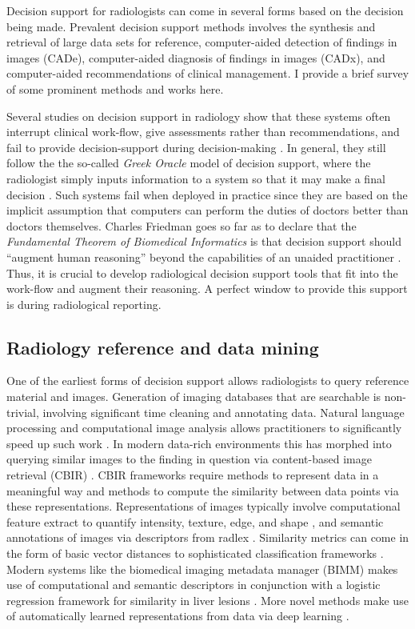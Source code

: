 Decision support for radiologists can come in several forms based on the decision being made. Prevalent decision support methods involves the synthesis and retrieval of large data sets for reference, computer-aided detection of findings in images (CADe), computer-aided diagnosis of findings in images (CADx), and computer-aided recommendations of clinical management. I provide a brief survey of some prominent methods and works here.


Several studies on decision support in radiology show that these systems often interrupt clinical  work-flow, give assessments rather than recommendations, and fail to provide decision-support during decision-making \cite{Kawamoto:2005gn,Morgan:2011ct}. In general, they still follow the the so-called \emph{Greek Oracle} model of decision support, where the radiologist simply inputs information to a system so that it may make a final decision \cite{Miller:1990wg,Miller:1994cx}. Such systems fail when deployed in practice since they are based on the implicit assumption that computers can perform the duties of doctors better than doctors themselves. Charles Friedman goes so far as to declare that the \emph{Fundamental Theorem of Biomedical Informatics} is that decision support should ``augment human reasoning'' beyond the capabilities of an unaided practitioner \cite{Friedman:2009dx}. Thus, it is crucial to develop radiological decision support tools that fit into the work-flow and augment their reasoning. A perfect window to provide this support is during radiological reporting.


\subsection{Radiology reference and data mining}
One of the earliest forms of decision support allows radiologists to query reference material and images. Generation of imaging databases that are searchable is non-trivial, involving significant time cleaning and annotating data. Natural language processing and computational image analysis allows practitioners to significantly speed up such work  \cite{Depeursinge:2012ce, Bozkurt:2014jw,Nassif:2009du}. In modern data-rich environments this has morphed into querying similar images to the finding in question via content-based image retrieval (CBIR) \cite{Akgul:2011ey}. CBIR frameworks require methods to represent data in a meaningful way and methods to compute the similarity between data points via these representations. Representations of images typically involve computational feature extract to quantify intensity, texture, edge, and shape \cite{Strela:2002vq,Zhao:2005wb, Hong:2006ti,Manay:2006un,MRangayyan:2005td,Xu:2012bh}, and semantic annotations of images via descriptors from radlex \cite{Langlotz:2006jn}. Similarity metrics can come in the form of basic vector distances to sophisticated classification frameworks \cite{Akgul:2011ey}. Modern systems like the biomedical imaging metadata manager (BIMM) makes use of computational and semantic descriptors in conjunction with a logistic regression framework for similarity in liver lesions \cite{Korenblum:2011gx}. More novel methods make use of automatically learned representations from data via deep learning \cite{Shin:2015wl}. 

